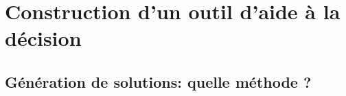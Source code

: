 








\section{Construction d’un outil d’aide à la décision} %
\label{sec:construction_d_un_outil_d_aide_à_la_decision}


\subsection{Génération de solutions: quelle méthode ?} %
\label{sub:generation_de_solutions_quelle_methode}

